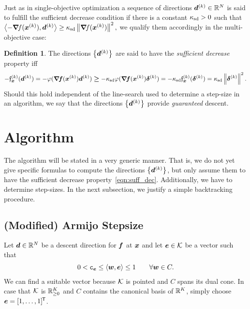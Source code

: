 \documentclass{article}
\theoremstyle{plain}
\theoremstyle{definition}
\newtheorem{definition}[theorem]{Definition}
\begin{document}
Just as in single-objective optimization a sequence of directions 
$\bm{d}^{(k)}\in \mathbb R^N$ 
is said to fulfill the sufficient decrease condition if there is a constant
$\kappa_{\mathrm{sd}} > 0$ such that
$\left\langle -\bm{\nabla}\!f(\bm{x}^{(k)}), \bm{d}^{(k)} \right\rangle \geq \kappa_{\mathrm{sd}} \left\|\bm{\nabla}\!f(\bm{x}^{(k)})\right\|^2,$
we qualify them accordingly in the multi-objective case:

\begin{definition}
	The directions $\left\{\bm{d}^{(k)}\right\}$ are said to have the 
	\emph{sufficient decrease} property iff	
		\begin{equation}
		- 
			\mathfrak{f}_{\bm{x}}^{(k)}(\bm{d}^{(k)}) 
		=
			-\varphi(\bm{\nabla}\!\bm{f}(\bm{x}^{(k)})\bm{d}^{(k)}) 
		\bm{\geq}
			- \kappa_{\mathrm{sd}} \varphi(\bm{\nabla}\!\bm{f}(\bm{x}^{(k)})\bm{\delta}^{(k)})
		= 
			- \kappa_{\mathrm{sd}} \mathfrak{f}_{\bm{x}}^{(k)}(\bm{\delta}^{(k)})
		=
			\kappa_{\mathrm{sd}} \left\|\bm{\delta}^{(k)}\right\|^2.
		\label{eqn:suff_dec}
		\end{equation}
	Should this hold independent of the line-search used to 
	determine a step-size in an algorithm, we say that the directions
	$\left\{\bm{d}^{(k)}\right\}$ provide \emph{guaranteed} descent.
\end{definition}

\section{Algorithm}
The algorithm will be stated in a very generic manner.
That is, we do not yet give specific formulas to compute
the directions $\left\{\bm{d}^{(k)}\right\}$, but only assume them to have 
the sufficient decrease property~\eqref{eqn:suff_dec}.
Additionally, we have to determine step-sizes.
In the next subsection, we justify a simple backtracking
procedure.

\subsection{(Modified) Armijo Stepsize}
Let $\bm{d}\in \mathbb R^N$ be a descent direction for $\bm{f}$ at $\bm{x}$ and let $\bm{e}\in \mathcal K$
be a vector such that 
\begin{equation}
	0 < \mathtt{c}_{\bm{e}} \leq \left\langle \bm{w}, \bm{e} \right\rangle\leq 1 \qquad \forall \bm{w}\in C.
	\label{eqn:amidoDinarchy}
\end{equation}
We can find a suitable vector because $\mathcal K$ is pointed and $C$ spans its dual cone.
In case that $\mathcal K$ is $\mathbb R^K_{\geq 0}$ and $C$ contains the canonical basis of $\mathbb R^K$,
simply choose $\bm{e} = [1, \dots, 1]^{\mkern-1.5mu\mathsf{T}}$.
\end{document}
